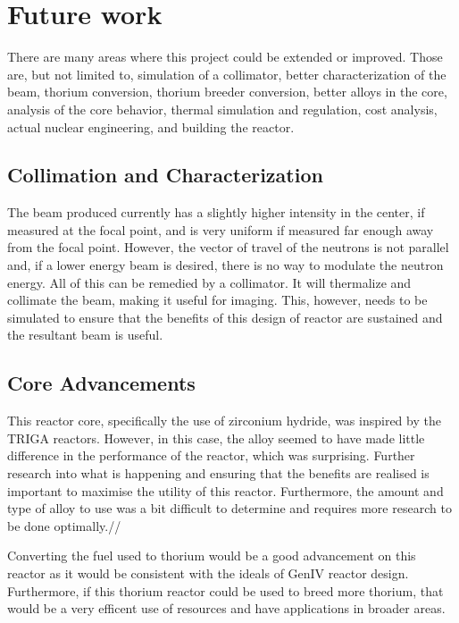 \section{Future work}
\label{sec:future}

There are many areas where this project could be extended or improved. Those are, but not limited to, simulation of a collimator, better characterization of the beam, thorium conversion, thorium breeder conversion, better alloys in the core, analysis of the core behavior, thermal simulation and regulation, cost analysis, actual nuclear engineering, and building the reactor.

\subsection{Collimation and Characterization}
The beam produced currently has a slightly higher intensity in the center, if measured at the focal point, and is very uniform if measured far enough away from the focal point. However, the vector of travel of the neutrons is not parallel and, if a lower energy beam is desired, there is no way to modulate the neutron energy. All of this can be remedied by a collimator. It will thermalize and collimate the beam, making it useful for imaging. This, however, needs to be simulated to ensure that the benefits of this design of reactor are sustained and the resultant beam is useful.

\subsection{Core Advancements}
This reactor core, specifically the use of zirconium hydride, was inspired by the TRIGA reactors. However, in this case, the alloy seemed to have made little difference in the performance of the reactor, which was surprising. Further research into what is happening and ensuring that the benefits are realised is important to maximise the utility of this reactor. Furthermore, the amount and type of alloy to use was a bit difficult to determine and requires more research to be done optimally.//

Converting the fuel used to thorium would be a good advancement on this reactor as it would be consistent with the ideals of GenIV reactor design. Furthermore, if this thorium reactor could be used to breed more thorium, that would be a very efficent use of resources and have applications in broader areas.

